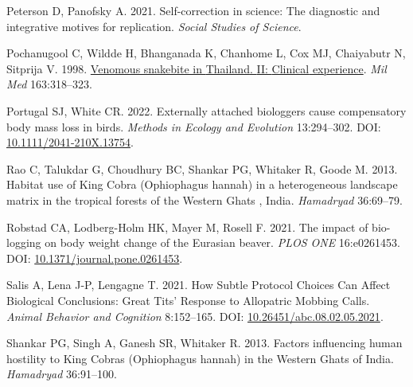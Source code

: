\documentclass[10pt,a4paper]{article}
\newlength{\cslhangindent}
\newenvironment{CSLReferences}[2] %
 {\begin{list}{}{%
  \setlength{\itemindent}{0pt}
  \setlength{\leftmargin}{0pt}
  \setlength{\parsep}{0pt}
  \ifodd #1
   \setlength{\leftmargin}{\cslhangindent}
   \setlength{\itemindent}{-1\cslhangindent}
  \fi
  \setlength{\itemsep}{#2\baselineskip}}}
 {\end{list}}
\begin{document}
\begin{CSLReferences}{1}{0}
Peterson D, Panofsky A. 2021. Self-correction in science: {The} diagnostic and integrative motives for replication. \emph{Social Studies of Science}.

Pochanugool C, Wildde H, Bhanganada K, Chanhome L, Cox MJ, Chaiyabutr N, Sitprija V. 1998. \href{https://www.ncbi.nlm.nih.gov/pubmed/9597849}{Venomous snakebite in {Thailand}. {II}: {Clinical} experience}. \emph{Mil Med} 163:318--323.

Portugal SJ, White CR. 2022. Externally attached biologgers cause compensatory body mass loss in birds. \emph{Methods in Ecology and Evolution} 13:294--302. DOI: \href{https://doi.org/10.1111/2041-210X.13754}{10.1111/2041-210X.13754}.

Rao C, Talukdar G, Choudhury BC, Shankar PG, Whitaker R, Goode M. 2013. Habitat use of {King} {Cobra} ({Ophiophagus} hannah) in a heterogeneous landscape matrix in the tropical forests of the {Western} {Ghats} , {India}. \emph{Hamadryad} 36:69--79.

Robstad CA, Lodberg-Holm HK, Mayer M, Rosell F. 2021. The impact of bio-logging on body weight change of the {Eurasian} beaver. \emph{PLOS ONE} 16:e0261453. DOI: \href{https://doi.org/10.1371/journal.pone.0261453}{10.1371/journal.pone.0261453}.

Salis A, Lena J-P, Lengagne T. 2021. How {Subtle} {Protocol} {Choices} {Can} {Affect} {Biological} {Conclusions}: {Great} {Tits}' {Response} to {Allopatric} {Mobbing} {Calls}. \emph{Animal Behavior and Cognition} 8:152--165. DOI: \href{https://doi.org/10.26451/abc.08.02.05.2021}{10.26451/abc.08.02.05.2021}.

Shankar PG, Singh A, Ganesh SR, Whitaker R. 2013. Factors influencing human hostility to {King} {Cobras} ({Ophiophagus} hannah) in the {Western} {Ghats} of {India}. \emph{Hamadryad} 36:91--100.


\end{CSLReferences}
\end{document}
